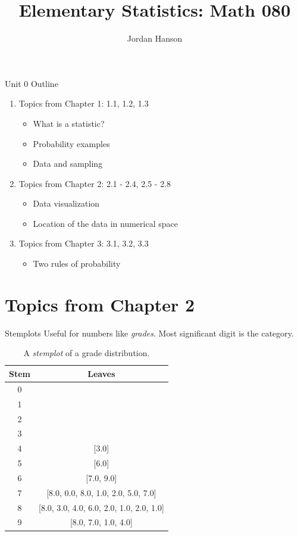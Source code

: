\documentclass{beamer}
\title{Elementary Statistics: Math 080}
\author{Jordan Hanson}
\institute{Whittier College Department of Physics and Astronomy}
\begin{document}
\maketitle

\begin{frame}{Unit 0 Outline}
\begin{enumerate}
\item Topics from Chapter 1: 1.1, 1.2, 1.3
\begin{itemize}
\item What is a statistic?
\item Probability examples
\item Data and sampling
\end{itemize}
\item Topics from Chapter 2: 2.1 - 2.4, 2.5 - 2.8
\begin{itemize}
\item Data visualization
\item Location of the data in numerical space
\end{itemize}
\item Topics from Chapter 3: 3.1, 3.2, 3.3
\begin{itemize}
\item Two rules of probability
\end{itemize}
\end{enumerate}
\end{frame}

\section{Topics from Chapter 2}

\begin{frame}[fragile]{Stemplots}
\small
Useful for numbers like \textit{grades}. Most significant digit is the category.
\begin{table}
\begin{tabular}{| c | c |}
\hline
\hline
Stem & Leaves \\ \hline
0 &   \\ \hline
1 &   \\ \hline
2 &   \\ \hline
3 &   \\ \hline
4 & [3.0] \\ \hline
5 & [6.0] \\ \hline
6 & [7.0, 9.0] \\ \hline
7 & [8.0, 0.0, 8.0, 1.0, 2.0, 5.0, 7.0] \\ \hline
8 & [8.0, 3.0, 4.0, 6.0, 2.0, 1.0, 2.0, 1.0] \\ \hline
9 & [8.0, 7.0, 1.0, 4.0] \\ \hline
\hline
\end{tabular}
\caption{A \textit{stemplot} of a grade distribution.}
\end{table}
\end{frame}
\end{document}
